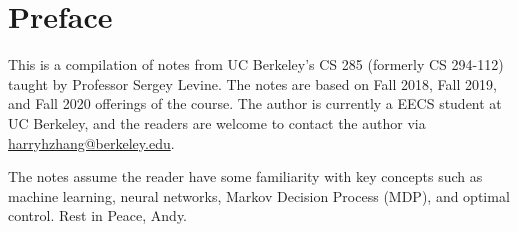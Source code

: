 \chapter*{Preface}
This is a compilation of notes from UC Berkeley's CS 285 (formerly CS 294-112) taught by Professor Sergey Levine. The notes are based on Fall 2018, Fall 2019, and Fall 2020 offerings of the course. The author is currently a EECS student at UC Berkeley, and the readers are welcome to contact the author via \href{mailto:harryhzhang@berkeley.edu}{harryhzhang@berkeley.edu}.

The notes assume the reader have some familiarity with key concepts such as machine learning, neural networks, Markov Decision Process (MDP), and optimal control.
\newline
\linebreak
Rest in Peace, Andy.